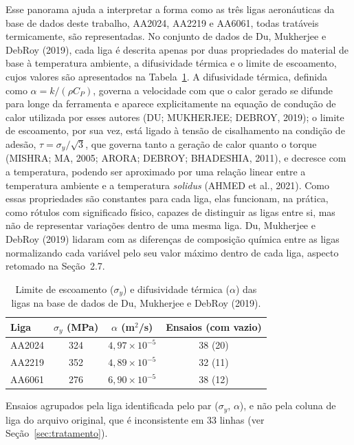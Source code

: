 \documentclass[12pt,openany]{report}
\begin{document}
Esse panorama ajuda a interpretar a forma como as três ligas aeronáuticas da base de dados deste trabalho, AA2024, AA2219 e AA6061, todas tratáveis termicamente, são representadas. No conjunto de dados de Du, Mukherjee e DebRoy (2019), cada liga é descrita apenas por duas propriedades do material de base à temperatura ambiente, a difusividade térmica e o limite de escoamento, cujos valores são apresentados na Tabela~\ref{tab:ligas}. A difusividade térmica, definida como $\alpha = k/(\rho C_P)$, governa a velocidade com que o calor gerado se difunde para longe da ferramenta e aparece explicitamente na equação de condução de calor utilizada por esses autores (DU; MUKHERJEE; DEBROY, 2019); o limite de escoamento, por sua vez, está ligado à tensão de cisalhamento na condição de adesão, $\tau = \sigma_{y}/\sqrt{3}$, que governa tanto a geração de calor quanto o torque (MISHRA; MA, 2005; ARORA; DEBROY; BHADESHIA, 2011), e decresce com a temperatura, podendo ser aproximado por uma relação linear entre a temperatura ambiente e a temperatura \textit{solidus} (AHMED et al., 2021). Como essas propriedades são constantes para cada liga, elas funcionam, na prática, como rótulos com significado físico, capazes de distinguir as ligas entre si, mas não de representar variações dentro de uma mesma liga. Du, Mukherjee e DebRoy (2019) lidaram com as diferenças de composição química entre as ligas normalizando cada variável pelo seu valor máximo dentro de cada liga, aspecto retomado na Seção~2.7.

\begin{table}[htbp]
\centering
\caption{Limite de escoamento ($\sigma_y$) e difusividade térmica ($\alpha$) das ligas na base de dados de Du, Mukherjee e DebRoy (2019).}
\label{tab:ligas}
\small
\begin{tabular}{lccc}
\toprule
\textbf{Liga} & \textbf{$\sigma_y$ (MPa)} & \textbf{$\alpha$ (m$^2$/s)} & \textbf{Ensaios (com vazio)} \\ \midrule
AA2024 & 324 & $4{,}97\times10^{-5}$ & 38 (20) \\
AA2219 & 352 & $4{,}89\times10^{-5}$ & 32 (11) \\
AA6061 & 276 & $6{,}90\times10^{-5}$ & 38 (12) \\ \bottomrule
\end{tabular}

\vspace{0.1cm}
\footnotesize Ensaios agrupados pela liga identificada pelo par ($\sigma_y$, $\alpha$), e não pela coluna de liga do arquivo original, que é inconsistente em 33 linhas (ver Seção~\ref{sec:tratamento}).
\end{table}
\end{document}
